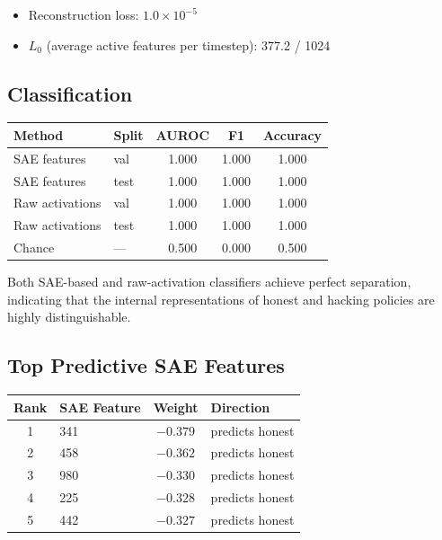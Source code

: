 \documentclass[11pt]{article}
\begin{document}
\begin{itemize}[nosep]
  \item Reconstruction loss: $1.0 \times 10^{-5}$
  \item $L_0$ (average active features per timestep): 377.2 / 1024
\end{itemize}

\subsection{Classification}

\begin{center}
\begin{tabular}{llccc}
\toprule
Method & Split & AUROC & F1 & Accuracy \\
\midrule
SAE features & val & 1.000 & 1.000 & 1.000 \\
SAE features & test & 1.000 & 1.000 & 1.000 \\
Raw activations & val & 1.000 & 1.000 & 1.000 \\
Raw activations & test & 1.000 & 1.000 & 1.000 \\
Chance & --- & 0.500 & 0.000 & 0.500 \\
\bottomrule
\end{tabular}
\end{center}

Both SAE-based and raw-activation classifiers achieve perfect separation, indicating that the internal representations of honest and hacking policies are highly distinguishable.

\subsection{Top Predictive SAE Features}

\begin{center}
\begin{tabular}{clcl}
\toprule
Rank & SAE Feature & Weight & Direction \\
\midrule
1 & 341 & $-0.379$ & predicts honest \\
2 & 458 & $-0.362$ & predicts honest \\
3 & 980 & $-0.330$ & predicts honest \\
4 & 225 & $-0.328$ & predicts honest \\
5 & 442 & $-0.327$ & predicts honest \\
\bottomrule
\end{tabular}
\end{center}
\end{document}
